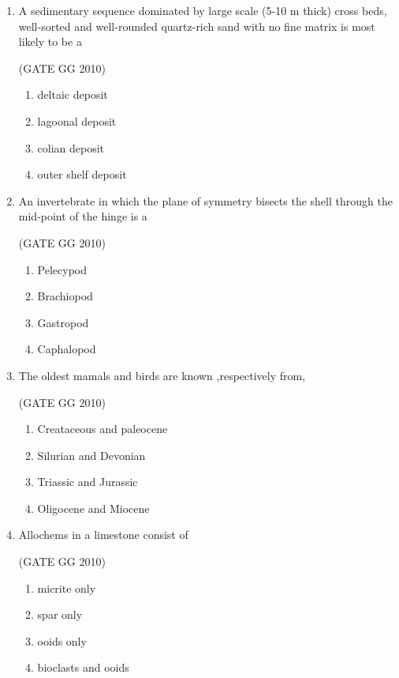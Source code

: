 \documentclass[journal]{IEEEtran}
\begin{document}
\begin{enumerate}
\item A sedimentary sequence dominated by large scale (5-10 m thick) cross beds, well-sorted and well-rounded quartz-rich sand with no fine matrix is most likely to be a

\hfill (GATE GG 2010) 

\begin{enumerate}
    \item deltaic deposit
    \item lagoonal deposit
    \item colian deposit
    \item outer shelf deposit
\end{enumerate}

\item An invertebrate in which the plane of symmetry bisects the shell through the mid-point of the hinge is a

\hfill (GATE GG 2010) 
\begin{multicols}{4}

\begin{enumerate}
    \item Pelecypod
    \item Brachiopod
    \item Gastropod
    \item Caphalopod
\end{enumerate}
\end{multicols}

\item The oldest mamals and birds are known ,respectively from,

\hfill (GATE GG 2010) 

 \begin{enumerate}
 \item Creataceous and paleocene
  \item Silurian and Devonian
   \item Triassic and Jurassic
    \item Oligocene and Miocene
 
\end{enumerate}


\item Allochems in a limestone consist of

\hfill (GATE GG 2010)

\begin{enumerate}
    \item micrite only
    \item spar only
    \item ooids only
    \item bioclasts and ooids
\end{enumerate}


\end{enumerate}
\end{document}
